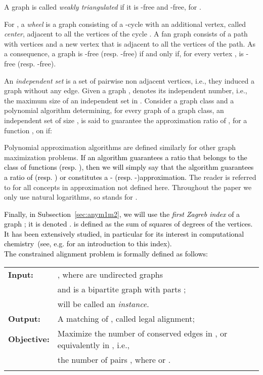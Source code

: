\documentclass[final]{dmtcs-episciences}
\newcommand\mar[1]{\textcolor{black}{#1}}
\begin{document}
A graph is called {\em weakly triangulated} if it is -free and -free, for .


For , a {\em wheel}  is a graph consisting of a -cycle  with an additional vertex, called {\em center}, adjacent to all the vertices of the  cycle . A fan graph  consists of a path  with  vertices and a new vertex  
that is adjacent to all the vertices of the path. As a consequence, a graph  is -free (resp. -free) if and only if, for every vertex ,  is -free (resp. -free).

An {\em independent set} is a set of  pairwise non adjacent vertices, i.e., they induced a graph without any edge. 
 Given a graph ,  denotes its independent number, i.e., the maximum size of an independent set in . Consider a graph class  and a polynomial algorithm 
 determining, for every graph  of a graph class, an independent set of size , is said to guarantee the approximation ratio of , for a function , on  if:
 
 
 Polynomial approximation algorithms are defined similarly for other graph maximization problems. \mar{If an algorithm guarantees a ratio that belongs to the class of functions  (resp. ), then we will simply say that the algorithm guarantees a ratio of  (resp. ) or constitutes a - (resp. -)approximation.} The reader is referred to \cite{ausiellobook} for all concepts in approximation not defined here. Throughout the paper we only use natural logarithms, so  stands for .   

\mar{Finally, in Subsection~\ref{sec:anym1m2}, we will use the {\em first Zagreb index} of a graph ; it is denoted .  is defined as the sum of  squares of  degrees of the vertices. It has been extensively studied, in particular for its interest in computational chemistry~(see, e.g. \citet{Zagreb-30years} for an introduction to this index).}\\

\noindent
\mar{The constrained alignment problem is formally defined as follows:}

\mar{
\begin{tabular}{ll}
\textbf{ Input:}& , where  are undirected graphs \\
& and    is a bipartite graph with parts ;\\
&  will be called an {\em instance}.\\
\textbf{ Output:}& A matching  of , called legal alignment;\\
\textbf{ Objective:}& Maximize the number of conserved edges in , or equivalently in , i.e., \\
& the number of pairs , where  or .\\
&
\end{tabular}}
\end{document}
